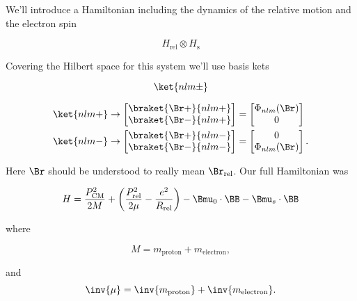 We'll introduce a Hamiltonian including the dynamics of the relative motion and the electron spin

\begin{equation}\label{eqn:qmTwoL16:n}
H_{\text{rel}} \otimes H_{\text{s}}
\end{equation}

Covering the Hilbert space for this system we'll use basis kets 

\begin{equation}\label{eqn:qmTwoL16:n}
\ket{nlm\pm}
\end{equation}

\begin{equation}\label{eqn:qmTwoL16:n}
\begin{aligned}
\ket{nlm+} 
&\rightarrow 
\begin{bmatrix}
\braket{\Br+}{nlm+} \\
\braket{\Br-}{nlm+} \\
\end{bmatrix}
=
\begin{bmatrix}
\Phi_{nlm}(\Br) \\
0
\end{bmatrix} \\
\ket{nlm-} 
&\rightarrow 
\begin{bmatrix}
\braket{\Br+}{nlm-} \\
\braket{\Br-}{nlm-} \\
\end{bmatrix}
=
\begin{bmatrix}
0 \\
\Phi_{nlm}(\Br) 
\end{bmatrix}.
\end{aligned}
\end{equation}

Here $\Br$ should be understood to really mean $\Br_\text{rel}$.  Our full Hamiltonian was

\begin{equation}\label{eqn:qmTwoL16:n}
H = 
\frac{P_\text{CM}^2}{2M} 
+ 
\left(
\frac{P_\text{rel}^2}{2\mu}
-
\frac{e^2}{R_\text{rel}}
\right)
- \Bmu_0 \cdot \BB
- \Bmu_s \cdot \BB
\end{equation}

where 

\begin{equation}\label{eqn:qmTwoL16:n}
M = m_\text{proton} + m_\text{electron},
\end{equation}

and
\begin{equation}\label{eqn:qmTwoL16:n}
\inv{\mu} = \inv{m_\text{proton}} + \inv{m_\text{electron}}.
\end{equation}

